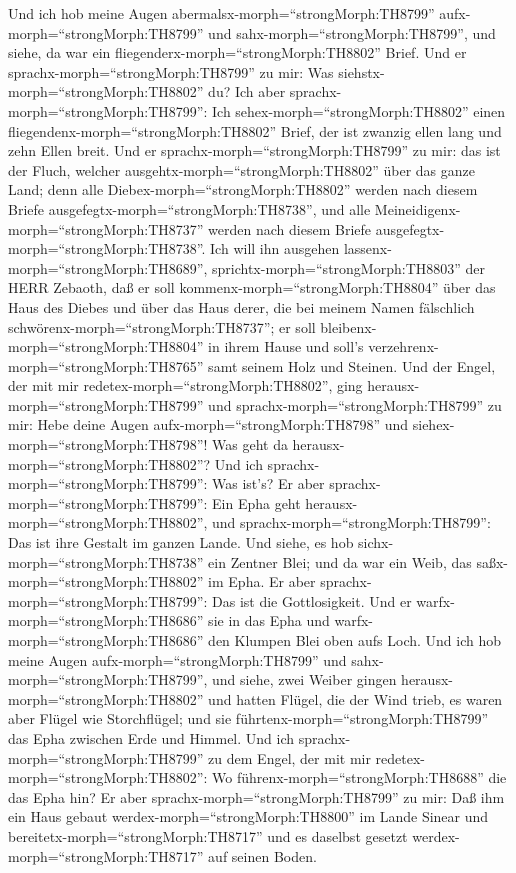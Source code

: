  Und ich hob meine Augen
abermalsx-morph=``strongMorph:TH8799'' aufx-morph=``strongMorph:TH8799''
und sahx-morph=``strongMorph:TH8799'', und siehe, da war ein
fliegenderx-morph=``strongMorph:TH8802'' Brief.  Und er
sprachx-morph=``strongMorph:TH8799'' zu mir: Was
siehstx-morph=``strongMorph:TH8802'' du? Ich aber
sprachx-morph=``strongMorph:TH8799'': Ich
sehex-morph=``strongMorph:TH8802'' einen
fliegendenx-morph=``strongMorph:TH8802'' Brief, der ist zwanzig ellen
lang und zehn Ellen breit.  Und er
sprachx-morph=``strongMorph:TH8799'' zu mir: das ist der Fluch, welcher
ausgehtx-morph=``strongMorph:TH8802'' über das ganze Land; denn alle
Diebex-morph=``strongMorph:TH8802'' werden nach diesem Briefe
ausgefegtx-morph=``strongMorph:TH8738'', und alle
Meineidigenx-morph=``strongMorph:TH8737'' werden nach diesem Briefe
ausgefegtx-morph=``strongMorph:TH8738''.  Ich will ihn
ausgehen lassenx-morph=``strongMorph:TH8689'',
sprichtx-morph=``strongMorph:TH8803'' der HERR Zebaoth, daß er soll
kommenx-morph=``strongMorph:TH8804'' über das Haus des Diebes und über
das Haus derer, die bei meinem Namen fälschlich
schwörenx-morph=``strongMorph:TH8737''; er soll
bleibenx-morph=``strongMorph:TH8804'' in ihrem Hause und soll's
verzehrenx-morph=``strongMorph:TH8765'' samt seinem Holz und Steinen.
 Und der Engel, der mit mir
redetex-morph=``strongMorph:TH8802'', ging
herausx-morph=``strongMorph:TH8799'' und
sprachx-morph=``strongMorph:TH8799'' zu mir: Hebe deine Augen
aufx-morph=``strongMorph:TH8798'' und
siehex-morph=``strongMorph:TH8798''! Was geht da
herausx-morph=``strongMorph:TH8802''?  Und ich
sprachx-morph=``strongMorph:TH8799'': Was ist's? Er aber
sprachx-morph=``strongMorph:TH8799'': Ein Epha geht
herausx-morph=``strongMorph:TH8802'', und
sprachx-morph=``strongMorph:TH8799'': Das ist ihre Gestalt im ganzen
Lande.  Und siehe, es hob sichx-morph=``strongMorph:TH8738''
ein Zentner Blei; und da war ein Weib, das
saßx-morph=``strongMorph:TH8802'' im Epha.  Er aber
sprachx-morph=``strongMorph:TH8799'': Das ist die Gottlosigkeit. Und er
warfx-morph=``strongMorph:TH8686'' sie in das Epha und
warfx-morph=``strongMorph:TH8686'' den Klumpen Blei oben aufs Loch.
 Und ich hob meine Augen aufx-morph=``strongMorph:TH8799''
und sahx-morph=``strongMorph:TH8799'', und siehe, zwei Weiber gingen
herausx-morph=``strongMorph:TH8802'' und hatten Flügel, die der Wind
trieb, es waren aber Flügel wie Storchflügel; und sie
führtenx-morph=``strongMorph:TH8799'' das Epha zwischen Erde und Himmel.
 Und ich sprachx-morph=``strongMorph:TH8799'' zu dem Engel,
der mit mir redetex-morph=``strongMorph:TH8802'': Wo
führenx-morph=``strongMorph:TH8688'' die das Epha hin?  Er
aber sprachx-morph=``strongMorph:TH8799'' zu mir: Daß ihm ein Haus
gebaut werdex-morph=``strongMorph:TH8800'' im Lande Sinear und
bereitetx-morph=``strongMorph:TH8717'' und es daselbst gesetzt
werdex-morph=``strongMorph:TH8717'' auf seinen Boden.

